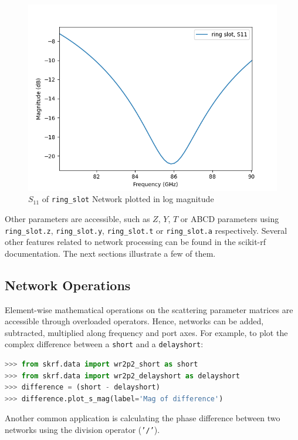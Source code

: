 \documentclass{IEEEjmw}
\begin{document}
\begin{figure}
	\centering
	\includegraphics[width=0.95\linewidth]{figures/figure2}
	\caption{$S_{11}$ of \texttt{ring\_slot} Network plotted in log magnitude}
	\label{fig:figure2}
\end{figure}

Other parameters are accessible, such as $Z$, $Y$, $T$ or ABCD parameters using \texttt{ring\_slot.z}, \texttt{ring\_slot.y}, \texttt{ring\_slot.t} or \texttt{ring\_slot.a} respectively. Several other features related to network processing can be found in the scikit-rf documentation. The next sections illustrate a few of them. 

\subsection{Network Operations}
Element-wise mathematical operations on the scattering parameter matrices are accessible through overloaded operators. Hence, networks can be added, subtracted, multiplied along frequency and port axes. For example, to plot the complex difference between a \texttt{short} and a \texttt{delayshort}:

\begin{lstlisting}[language=Python]
>>> from skrf.data import wr2p2_short as short
>>> from skrf.data import wr2p2_delayshort as delayshort
>>> difference = (short - delayshort)
>>> difference.plot_s_mag(label='Mag of difference')
\end{lstlisting}

Another common application is calculating the phase difference between two networks using the division operator (\texttt{'/'}). 
\end{document}
